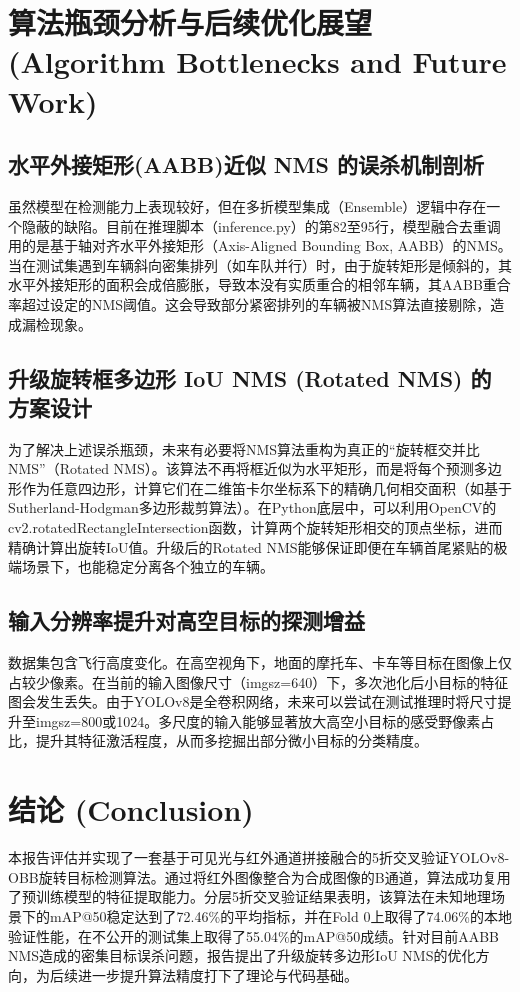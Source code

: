 \documentclass[utf8,a4paper,zihao=-4]{ctexart}
\begin{document}
\section{算法瓶颈分析与后续优化展望 (Algorithm Bottlenecks and Future Work)}

\subsection{水平外接矩形(AABB)近似 NMS 的误杀机制剖析}
虽然模型在检测能力上表现较好，但在多折模型集成（Ensemble）逻辑中存在一个隐蔽的缺陷。目前在推理脚本（inference.py）的第82至95行，模型融合去重调用的是基于轴对齐水平外接矩形（Axis-Aligned Bounding Box, AABB）的NMS。当在测试集遇到车辆斜向密集排列（如车队并行）时，由于旋转矩形是倾斜的，其水平外接矩形的面积会成倍膨胀，导致本没有实质重合的相邻车辆，其AABB重合率超过设定的NMS阈值。这会导致部分紧密排列的车辆被NMS算法直接剔除，造成漏检现象。

\subsection{升级旋转框多边形 IoU NMS (Rotated NMS) 的方案设计}
为了解决上述误杀瓶颈，未来有必要将NMS算法重构为真正的“旋转框交并比NMS”（Rotated NMS）。该算法不再将框近似为水平矩形，而是将每个预测多边形作为任意四边形，计算它们在二维笛卡尔坐标系下的精确几何相交面积（如基于Sutherland-Hodgman多边形裁剪算法）。在Python底层中，可以利用OpenCV的cv2.rotatedRectangleIntersection函数，计算两个旋转矩形相交的顶点坐标，进而精确计算出旋转IoU值。升级后的Rotated NMS能够保证即便在车辆首尾紧贴的极端场景下，也能稳定分离各个独立的车辆。

\subsection{输入分辨率提升对高空目标的探测增益}
数据集包含飞行高度变化。在高空视角下，地面的摩托车、卡车等目标在图像上仅占较少像素。在当前的输入图像尺寸（imgsz=640）下，多次池化后小目标的特征图会发生丢失。由于YOLOv8是全卷积网络，未来可以尝试在测试推理时将尺寸提升至imgsz=800或1024。多尺度的输入能够显著放大高空小目标的感受野像素占比，提升其特征激活程度，从而多挖掘出部分微小目标的分类精度。

\section{结论 (Conclusion)}
本报告评估并实现了一套基于可见光与红外通道拼接融合的5折交叉验证YOLOv8-OBB旋转目标检测算法。通过将红外图像整合为合成图像的B通道，算法成功复用了预训练模型的特征提取能力。分层5折交叉验证结果表明，该算法在未知地理场景下的mAP@50稳定达到了72.46\%的平均指标，并在Fold 0上取得了74.06\%的本地验证性能，在不公开的测试集上取得了55.04\%的mAP@50成绩。针对目前AABB NMS造成的密集目标误杀问题，报告提出了升级旋转多边形IoU NMS的优化方向，为后续进一步提升算法精度打下了理论与代码基础。
\end{document}
